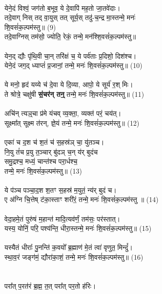 \\
येने॒दं विश्वं॒ जग॑तो ब॒भूव॒ ये दे॒वापि॑ मह॒तो जा॒तवे॑दाः।\\
तदे॒वाग् निस् तद् वा॒युस् तत् सूर्य॒स् तदु॑-च॒न्द्र मा॒स्तन्मे॒ मनः॑\\
 शि॒वसं॑क॒ल्पम॑स्तु॥ (9)\\
{\small तदे॒वाग्निस् तम॑सो॒ ज्योति॒ रेकं॒ तन्मे॒ मन॑श्शि॒वसं॑क॒ल्पम॑स्तु॥}\\
\\
येन॒द् द्यौः पृ॑थि॒वी चा॒न् तरि॑क्षं च॒ ये पर्व॑ताः प्र॒दिशो॒ दिश॑श्च। \\
येने॒दं जग॒द् ध्याप्तं॑ प्र॒जानां॒ तन्मे॒ मनः॑ शि॒वसं॑क॒ल्पम॑स्तु॥ (10)\\
\\
ये मनो॒ हृद॑ यय्ये च॑ दे॒वा ये दि॒व्या, आपो॒ ये सूर्य॑ र॒श् मिः। \\
ते श्रोत्रे॒ चक्षु॑षी \textbf{सं॒चर॑न् तन्॒} तन्मे॒ मनः॑ शि॒वसं॑क॒ल्पम॑स्तु॥ (11)\\
\\
अचि॑न् त्यञ्॒चा प्र॑मे यंचव् व्य॒क्ता॒, व्यक्त॑ परं॒ चय॑त्। \\
सूक्ष्मा᳚त् सूक्ष्म त॑रन्, ज्ञे॒यं तन्मे॒ मनः॑ शि॒वसं॑क॒ल्पम॑स्तु॥ (12)\\
\\
एका॑ च द॒श च॑ श॒तं च॑ स॒हस्र॑ञ् चा॒ यु॑तञ्च। \\
नि॒यु तं॑च प्र॒यु त॒ञ्चार् बु॑दञ् च॒न् य॑र् बुदंच \\
{\small समु॒द्रश्च॒ मध्यं॒ चान्त॑श्च परा॒र्धश्च॒}\\
तन्मे॒ मनः॑ शि॒वसं॑क॒ल्पम॑स्तु॥ (13)\\
\\
ये प॑ञ्च पञ्चा॒द॒श श॒तꣳ स॒हस्र॑ म॒युतं॒ न्य॑र् बुदं च। \\
ए अ॑ग्नि चि॒त्तेष् ट॑का॒स्ताꣳ शरी॑रं॒ तन्मे॒ मनः॑ शि॒वसं॑क॒ल्पम॑स्तु ॥ (14)\\
\\
वेदा॒हमे॒तं पुरु॑षं म॒हान्त॑ मादि॒त्यव॑र्णं॒ तम॑सः॒ पर॑स्तात्। \\
यस्य॒ योनिं॒ परि॒ पश्य॑न्ति॒ धीरा॒स्तन्मे॒ मनः॑ शि॒वसं॑क॒ल्पम॑स्तु॥ (15)\\
\\
यस्यैतं धीराः᳚ पु॒नन्ति॑ क॒वयो᳚ ब्र॒ह्माण॑ मे॒तं त्वा॑ वृणुत॒ मिन्दुं᳚। \\
स्था॒व॒रं जङ्ग॑मं॒ द्यौरा॑का॒शं॒ तन्मे॒ मनः॑ शि॒वसं॑क॒ल्पम॑स्तु॥ (16)\\
\\
{\small {}}\\
परा᳚त् प॒रत॑रं ब्र॒ह्म॒ त॒त् परा᳚त् पर॒तो ह॑रिः। \\
